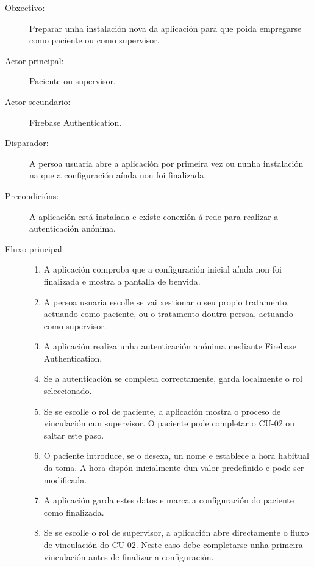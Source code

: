 \begin{description}

\item[Obxectivo:] Preparar unha instalación nova da aplicación para que poida
empregarse como paciente ou como supervisor.

\item[Actor principal:] Paciente ou supervisor.

\item[Actor secundario:] Firebase Authentication.

\item[Disparador:] A persoa usuaria abre a aplicación por primeira vez ou nunha
instalación na que a configuración aínda non foi finalizada.

\item[Precondicións:] A aplicación está instalada e existe conexión á rede para
realizar a autenticación anónima.

\item[Fluxo principal:] \hfill
\begin{enumerate}
    \item A aplicación comproba que a configuración inicial aínda non foi
    finalizada e mostra a pantalla de benvida.

    \item A persoa usuaria escolle se vai xestionar o seu propio tratamento,
    actuando como paciente, ou o tratamento doutra persoa, actuando como
    supervisor.

    \item A aplicación realiza unha autenticación anónima mediante Firebase
    Authentication.

    \item Se a autenticación se completa correctamente, garda localmente o rol
    seleccionado.

    \item Se se escolle o rol de paciente, a aplicación mostra o proceso de
    vinculación cun supervisor. O paciente pode completar o CU-02 ou saltar
    este paso.

    \item O paciente introduce, se o desexa, un nome e establece a hora habitual
    da toma. A hora dispón inicialmente dun valor predefinido e pode ser
    modificada.

    \item A aplicación garda estes datos e marca a configuración do paciente
    como finalizada.

    \item Se se escolle o rol de supervisor, a aplicación abre directamente
    o fluxo de vinculación do CU-02. Neste caso debe completarse unha primeira
    vinculación antes de finalizar a configuración.


\end{enumerate}
\end{description}
